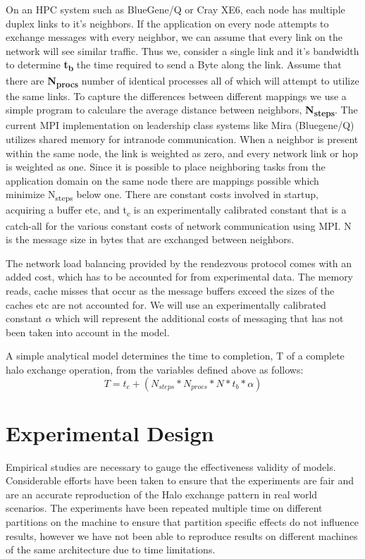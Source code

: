 \documentclass{acm_proc_article-sp}
\begin{document}
On an HPC system such as BlueGene/Q or Cray XE6, each node has multiple duplex links to it's neighbors.
If the application on every node attempts to exchange messages with every neighbor, we can assume that
every link on the network will see similar traffic. Thus we, consider a single link and it's bandwidth
to determine \textbf{t\textsubscript{b}} the time required to send a Byte along the link.
Assume that there are \textbf{N\textsubscript{procs}} number of identical processes all of which will attempt to utilize the same links.
To capture the differences between different mappings we use a simple program to calculare the average distance between neighbors,
\textbf{N\textsubscript{steps}}. The current MPI implementation on leadership class systems like Mira (Bluegene/Q) utilizes
shared memory for intranode communication. When a neighbor is present within the same node, the link
is weighted as zero, and every network link or hop is weighted as one. Since it is possible to place
neighboring tasks from the application domain on the same node there are mappings possible which
minimize N\textsubscript{steps} below one. There are constant costs involved in startup, acquiring a buffer etc,
and t\textsubscript{c} is an experimentally calibrated constant that is a catch-all for the various constant costs
of network communication using MPI. N is the message size in bytes that are exchanged between neighbors.

The network load balancing provided by the rendezvous protocol comes with an added cost, which has to be
accounted for from experimental data. The memory reads, cache misses that occur as the message buffers exceed
the sizes of the caches etc are not accounted for. We will use an experimentally calibrated constant \textbf{$\alpha$}
which will represent the additional costs of messaging that has not been taken into account in the model.

A simple analytical model determines the time to completion, T of a complete halo exchange operation,
from the variables defined above as follows:
\begin{equation}
  T = t_c + (N_{steps} * N_{procs} * N * t_b * \alpha)
\end{equation}


\section{Experimental Design}

Empirical studies are necessary to gauge the effectiveness validity of models. Considerable efforts have
been taken to ensure that the experiments are fair and are an accurate reproduction of the Halo exchange pattern
in real world scenarios. The experiments have been repeated multiple time on different partitions on the machine
to ensure that partition specific effects do not influence results, however we have not been able to reproduce
results on different machines of the same architecture due to time limitations.
\end{document}
